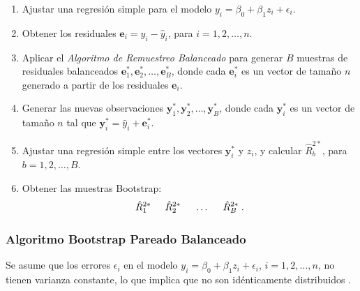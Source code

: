 \begin{enumerate}
	\item Ajustar una regresión simple para el modelo \( y_{i} = \beta_{0} + \beta_{1}z_{i} + \epsilon_{i} \).
	
	\item Obtener los residuales \( \mathbf{e}_{i} = y_{i} - \hat{y}_{i} \), para \( i = 1, 2, \dots, n \).
	
	\item Aplicar el \textit{Algoritmo de Remuestreo Balanceado} para generar \( B \) muestras de residuales balanceados \( \mathbf{e}^{*}_{1}, \mathbf{e}^{*}_{2}, \dots, \mathbf{e}^{*}_{B} \), donde cada \( \mathbf{e}^{*}_{i} \) es un vector de tamaño \( n \) generado a partir de los residuales \( \mathbf{e}_{i} \).
	
	\item Generar las nuevas observaciones \( \mathbf{y}^{*}_{1}, \mathbf{y}^{*}_{2}, \dots, \mathbf{y}^{*}_{B} \), donde cada \( \mathbf{y}^{*}_{i} \) es un vector de tamaño \( n \) tal que \( \mathbf{y}^{*}_{i} = \hat{y}_{i} + \mathbf{e}^{*}_{i} \).
	
	\item Ajustar una regresión simple entre los vectores \( \mathbf{y}^{*}_{i} \) y \( z_{i} \), y calcular \( \hat{R}^{2*}_{b} \), para \( b = 1, 2, \dots, B \).
	
	\item Obtener las muestras Bootstrap:
	\[
	\hat{R}^{2*}_{1} \hspace{.5cm} \hat{R}^{2*}_{2} \hspace{.5cm} \dots \hspace{.5cm} \hat{R}^{2*}_{B} \; .
	\]
\end{enumerate}


\subsubsection{Algoritmo Bootstrap Pareado Balanceado}

Se asume que los errores \( \epsilon_{i} \) en el modelo 
\( y_{i} = \beta_{0} + \beta_{1}z_{i} + \epsilon_{i} \), \( i = 1, 2, \dots, n \), no tienen varianza constante, lo que implica que no son idénticamente distribuidos \parencites{givens-2013, montgomery-2017}.

